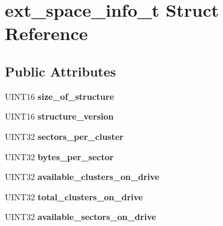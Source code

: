 \hypertarget{structext__space__info__t}{\section{ext\-\_\-space\-\_\-info\-\_\-t Struct Reference}
\label{structext__space__info__t}
}
\subsection*{Public Attributes}
\begin{DoxyCompactItemize}
\item 
\hypertarget{structext__space__info__t_ab5a08681fe7bd8791d1dc2cae7d3b2ee}{U\-I\-N\-T16 {\bfseries size\-\_\-of\-\_\-structure}}\label{structext__space__info__t_ab5a08681fe7bd8791d1dc2cae7d3b2ee}

\item 
\hypertarget{structext__space__info__t_a35a1dbf77df760376dbafd12cc69a44b}{U\-I\-N\-T16 {\bfseries structure\-\_\-version}}\label{structext__space__info__t_a35a1dbf77df760376dbafd12cc69a44b}

\item 
\hypertarget{structext__space__info__t_a7426cc64c72da1e6eea9f71b9cf3b801}{U\-I\-N\-T32 {\bfseries sectors\-\_\-per\-\_\-cluster}}\label{structext__space__info__t_a7426cc64c72da1e6eea9f71b9cf3b801}

\item 
\hypertarget{structext__space__info__t_a95486a295b10c5bfb469ee5419074e17}{U\-I\-N\-T32 {\bfseries bytes\-\_\-per\-\_\-sector}}\label{structext__space__info__t_a95486a295b10c5bfb469ee5419074e17}

\item 
\hypertarget{structext__space__info__t_ae04fa02007f95d2b9d44bf6048b1327a}{U\-I\-N\-T32 {\bfseries available\-\_\-clusters\-\_\-on\-\_\-drive}}\label{structext__space__info__t_ae04fa02007f95d2b9d44bf6048b1327a}

\item 
\hypertarget{structext__space__info__t_adc398f6c9b667a962c8131ff22d6322e}{U\-I\-N\-T32 {\bfseries total\-\_\-clusters\-\_\-on\-\_\-drive}}\label{structext__space__info__t_adc398f6c9b667a962c8131ff22d6322e}

\item 
\hypertarget{structext__space__info__t_ad488ae370304cd87c1ba1c4c62ddd4ca}{U\-I\-N\-T32 {\bfseries available\-\_\-sectors\-\_\-on\-\_\-drive}}\label{structext__space__info__t_ad488ae370304cd87c1ba1c4c62ddd4ca}


\end{DoxyCompactItemize}
